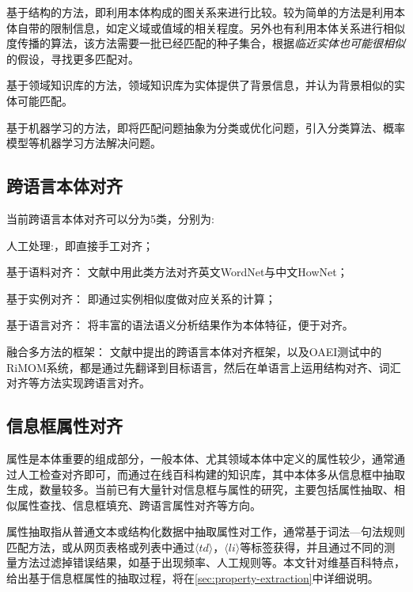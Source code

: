 {\heiti 基于结构的方法\cite{hu2008matching}}，即利用本体构成的图关系来进行比较。较为简单的方法是利用本体自带的限制信息，如定义域或值域的相关程度。另外也有利用本体关系进行相似度传播的算法，该方法需要一批已经匹配的种子集合，根据\textit{临近实体也可能很相似}的假设，寻找更多匹配对。

{\heiti 基于领域知识库的方法\cite{ponzetto2009large,gligorov2007using}}，领域知识库为实体提供了背景信息，并认为背景相似的实体可能匹配。

{\heiti 基于机器学习的方法\cite{niepert2010probabilistic,albagli2012markov}}，即将匹配问题抽象为分类或优化问题，引入分类算法、概率模型等机器学习方法解决问题。


\subsection{跨语言本体对齐}
当前跨语言本体对齐可以分为5类\cite{}，分别为:

{\heiti 人工处理\cite{}:}，即直接手工对齐；

{\heiti 基于语料对齐：} 文献\cite{}中用此类方法对齐英文WordNet与中文HowNet；

{\heiti 基于实例对齐：} 即通过实例相似度做对应关系的计算\cite{}；

{\heiti 基于语言对齐：} 将丰富的语法语义分析结果作为本体特征，便于对齐。

{\heiti 融合多方法的框架：} 文献\cite{}中提出的跨语言本体对齐框架，以及OAEI测试中的RiMOM系统\cite{}，都是通过先翻译到目标语言，然后在单语言上运用结构对齐、词汇对齐等方法实现跨语言对齐。

\subsection{信息框属性对齐}
\label{sec:property-research}
属性是本体重要的组成部分，一般本体、尤其领域本体中定义的属性较少，通常通过人工检查对齐即可\cite{wang:movie}，而通过在线百科构建的知识库，其中本体多从信息框中抽取生成，数量较多。当前已有大量针对信息框与属性的研究，主要包括属性抽取、相似属性查找、信息框填充、跨语言属性对齐等方向。

{\heiti 属性抽取}指从普通文本或结构化数据中抽取属性对工作，通常基于词法—句法规则匹配方法\cite{pacsca2007role,lee2013attribute}，或从网页表格或列表中通过$\langle td\rangle$，$\langle li\rangle$等标签获得\cite{crestan2010web}，并且通过不同的测量方法过滤掉错误结果，如基于出现频率\cite{pacsca2007role}、人工规则\cite{lee2013attribute}等。本文针对维基百科特点，给出基于信息框属性的抽取过程，将在\ref{sec:property-extraction}中详细说明。

